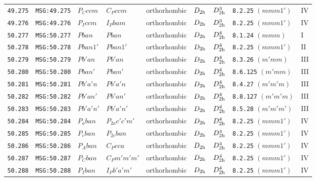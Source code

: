\documentclass[fleqn,10pt]{jsarticle}
\begin{document}
\begin{center}
\begin{longtable}{lllllllll}
\texttt{49.275} & \texttt{MSG:49.275} & $P_{C}ccm$ & $C_{P}ccm$ & orthorhombic & $D_{\rm 2h}$ & $D_{\rm 2h}^{3}$ & \texttt{8.2.25} $(mmm1')$ & IV \\
\texttt{49.276} & \texttt{MSG:49.276} & $P_{I}ccm$ & $I_{P}bam$ & orthorhombic & $D_{\rm 2h}$ & $D_{\rm 2h}^{3}$ & \texttt{8.2.25} $(mmm1')$ & IV \\ \hline
\texttt{50.277} & \texttt{MSG:50.277} & $Pban$ & $Pban$ & orthorhombic & $D_{\rm 2h}$ & $D_{\rm 2h}^{4}$ & \texttt{8.1.24} $(mmm)$ & I \\
\texttt{50.278} & \texttt{MSG:50.278} & $Pban1'$ & $Pban1'$ & orthorhombic & $D_{\rm 2h}$ & $D_{\rm 2h}^{4}$ & \texttt{8.2.25} $(mmm1')$ & II \\
\texttt{50.279} & \texttt{MSG:50.279} & $Pb'an$ & $Pb'an$ & orthorhombic & $D_{\rm 2h}$ & $D_{\rm 2h}^{4}$ & \texttt{8.3.26} $(m'mm)$ & III \\
\texttt{50.280} & \texttt{MSG:50.280} & $Pban'$ & $Pban'$ & orthorhombic & $D_{\rm 2h}$ & $D_{\rm 2h}^{4}$ & \texttt{8.6.125} $(m'mm)$ & III \\
\texttt{50.281} & \texttt{MSG:50.281} & $Pb'a'n$ & $Pb'a'n$ & orthorhombic & $D_{\rm 2h}$ & $D_{\rm 2h}^{4}$ & \texttt{8.4.27} $(m'm'm)$ & III \\
\texttt{50.282} & \texttt{MSG:50.282} & $Pb'an'$ & $Pb'an'$ & orthorhombic & $D_{\rm 2h}$ & $D_{\rm 2h}^{4}$ & \texttt{8.8.127} $(m'm'm)$ & III \\
\texttt{50.283} & \texttt{MSG:50.283} & $Pb'a'n'$ & $Pb'a'n'$ & orthorhombic & $D_{\rm 2h}$ & $D_{\rm 2h}^{4}$ & \texttt{8.5.28} $(m'm'm')$ & III \\
\texttt{50.284} & \texttt{MSG:50.284} & $P_{a}ban$ & $P_{2a}c'c'm'$ & orthorhombic & $D_{\rm 2h}$ & $D_{\rm 2h}^{4}$ & \texttt{8.2.25} $(mmm1')$ & IV \\
\texttt{50.285} & \texttt{MSG:50.285} & $P_{c}ban$ & $P_{2c}ban$ & orthorhombic & $D_{\rm 2h}$ & $D_{\rm 2h}^{4}$ & \texttt{8.2.25} $(mmm1')$ & IV \\
\texttt{50.286} & \texttt{MSG:50.286} & $P_{A}ban$ & $C_{P}cca$ & orthorhombic & $D_{\rm 2h}$ & $D_{\rm 2h}^{4}$ & \texttt{8.2.25} $(mmm1')$ & IV \\
\texttt{50.287} & \texttt{MSG:50.287} & $P_{C}ban$ & $C_{P}m'm'm'$ & orthorhombic & $D_{\rm 2h}$ & $D_{\rm 2h}^{4}$ & \texttt{8.2.25} $(mmm1')$ & IV \\
\texttt{50.288} & \texttt{MSG:50.288} & $P_{I}ban$ & $I_{P}b'a'm'$ & orthorhombic & $D_{\rm 2h}$ & $D_{\rm 2h}^{4}$ & \texttt{8.2.25} $(mmm1')$ & IV \\ \hline

\end{longtable}
\end{center}
\end{document}
